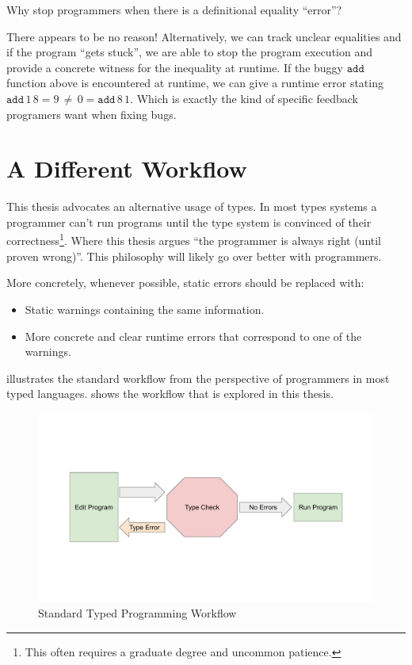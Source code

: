 Why stop programmers when there is a definitional equality ``error''? 

There appears to be no reason! Alternatively, we can track unclear equalities and if the program ``gets stuck'', we are able to stop the program execution and provide a concrete witness for the inequality at runtime.
If the buggy $\mathtt{add}$ function above is encountered at runtime, we can give a runtime error stating $\mathtt{add}\,1\,8=9\,\neq\,0=\mathtt{add}\,8\,1$.
Which is exactly the kind of specific feedback programers want when fixing bugs.

\section{A Different Workflow}

This thesis advocates an alternative usage of types. In most types systems a programmer can't run programs until the type system is convinced of their correctness\footnote{
 This often requires a graduate degree and uncommon patience.
}.
Where this thesis argues ``the programmer is always right (until proven wrong)''.
This philosophy will likely go over better with programmers.

More concretely, whenever possible, static errors should be replaced with:
\begin{itemize}
\item Static warnings containing the same information.
\item More concrete and clear runtime errors that correspond to one of the warnings.
\end{itemize}
 illustrates the standard workflow from the perspective of programmers in most typed languages.
 shows the workflow that is explored in this thesis.

\begin{figure}

\centerline{\includegraphics[width=5in]{fig/standardWorkflow.pdf}}

\caption{Standard Typed Programming Workflow}
\label{fig:intro-standard-workflow}
\end{figure}

